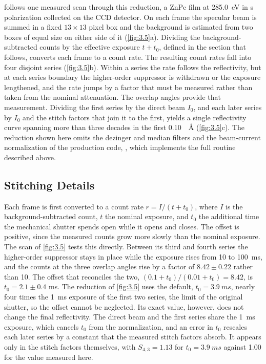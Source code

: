  follows one measured scan through this reduction, a ZnPc film at \qty{285.0}{eV} in s polarization collected on the CCD detector. On each frame the specular beam is summed in a fixed \(13 \times 13\) pixel box and the background is estimated from two boxes of equal size on either side of it (\cref{fig:3.5}a). Dividing the background-subtracted counts by the effective exposure \(t + t_{0}\), defined in the section that follows, converts each frame to a count rate. The resulting count rates fall into four disjoint series (\cref{fig:3.5}b). Within a series the rate follows the reflectivity, but at each series boundary the higher-order suppressor is withdrawn or the exposure lengthened, and the rate jumps by a factor that must be measured rather than taken from the nominal attenuation. The overlap angles provide that measurement. Dividing the first series by the direct beam \(I_{0}\), and each later series by \(I_{0}\) and the stitch factors that join it to the first, yields a single reflectivity curve spanning more than three decades in the first \qty{0.10}{\per\angstrom} (\cref{fig:3.5}c). The reduction shown here omits the dezinger and median filters and the beam-current normalization of the production code, ,\autocite{ALSRSOXSPxrreduce2026} which implements the full routine described above.

\subsection{Stitching Details}\label{sec:stitching-details}

Each frame is first converted to a count rate \(r = I/(t + t_{0})\), where \(I\) is the background-subtracted count, \(t\) the nominal exposure, and \(t_{0}\) the additional time the mechanical shutter spends open while it opens and closes. The offset is positive, since the measured counts grow more slowly than the nominal exposure. The scan of \cref{fig:3.5} tests this directly. Between its third and fourth series the higher-order suppressor stays in place while the exposure rises from 10 to \qty{100}{ms}, and the counts at the three overlap angles rise by a factor of \(8.42 \pm 0.22\) rather than 10. The offset that reconciles the two, \((0.1 + t_{0})/(0.01 + t_{0}) = 8.42\), is \(t_{0} = 2.1 \pm 0.4\) ms. The reduction of \cref{fig:3.5} uses the  default, \(t_{0} = \qty{3.9}{ms}\), nearly four times the \qty{1}{ms} exposure of the first two series, the limit of the original shutter, so the offset cannot be neglected. Its exact value, however, does not change the final reflectivity. The direct beam and the first series share the \qty{1}{ms} exposure, which cancels \(t_{0}\) from the normalization, and an error in \(t_{0}\) rescales each later series by a constant that the measured stitch factors absorb. It appears only in the stitch factors themselves, with \(S_{4,3} = 1.13\) for \(t_{0} = \qty{3.9}{ms}\) against 1.00 for the value measured here.

